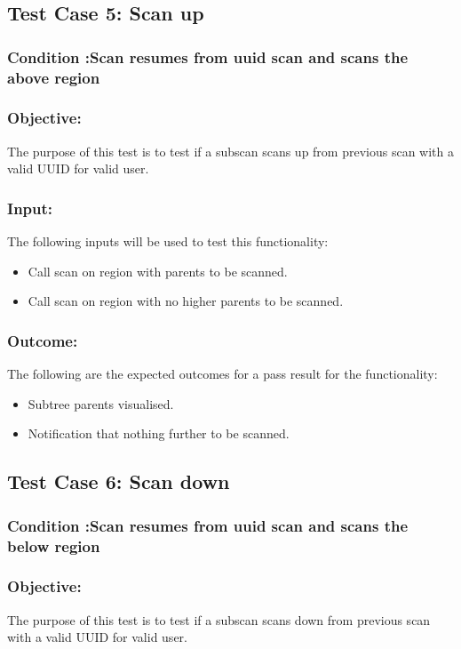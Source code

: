 \documentclass[hidelinks,a4paper,12pt]{article}
\begin{document}
\subsection{Test Case 5: Scan up }
\subsubsection{Condition :Scan resumes from uuid scan and scans the above region}
\subsubsection{Objective:} The purpose of this test is to test if a subscan scans up from previous scan with a valid UUID for valid user.

\subsubsection{Input:}
 The following inputs will be used to test this functionality:
\begin{itemize}
  \item Call scan on region with parents to be scanned.
   \item Call scan on region with no higher parents to be scanned.

\end{itemize}

\subsubsection{Outcome: }
The following are the expected outcomes for a pass result for the functionality:
\begin{itemize}
\item Subtree parents visualised.
\item Notification that nothing further to be scanned.

\end{itemize}

\subsection{Test Case 6: Scan down }
\subsubsection{Condition :Scan resumes from uuid scan and scans the below region}
\subsubsection{Objective:} The purpose of this test is to test if a subscan scans down from previous scan with a valid UUID for valid user.
\end{document}
